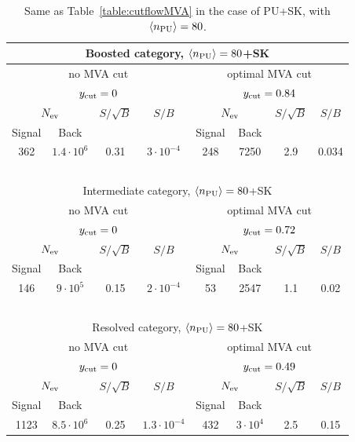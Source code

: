 \begin{table}[t]
  \centering
  \small
  \begin{tabular}{c|c|c|c||c|c|c|c}
    \hline
    \multicolumn{8}{c}{Boosted category, $\left\langle n_{\rm PU}\right\rangle=80$+SK}\\
    \hline
     \multicolumn{4}{c||}{no MVA cut} & \multicolumn{4}{c}{optimal MVA cut}\\
    \multicolumn{4}{c||}{$y_{\rm cut}=0$} & \multicolumn{4}{c}{$y_{\rm cut}=0.84$}\\
    \hline
    \multicolumn{2}{c|}{$N_{\rm ev}$} &  $S/\sqrt{B}$  & $S/B$
    & \multicolumn{2}{c|}{$N_{\rm ev}$} &  $S/\sqrt{B}$  & $S/B$\\
        Signal & Back   &     &   &  Signal & Back   &     &    \\
    \hline
    362  &  $1.4\cdot 10^6$     & 0.31       &  $3\cdot 10^{-4}$ &
    248     &   7250             &  2.9       & 0.034 \\
    \hline
       \multicolumn{8}{c}{$\quad$}\\
    \hline
    \multicolumn{8}{c}{Intermediate category,  $\left\langle n_{\rm PU}\right\rangle=80$+SK}\\
    \hline
    \multicolumn{4}{c||}{no MVA cut} & \multicolumn{4}{c}{optimal MVA cut}\\
    \multicolumn{4}{c||}{$y_{\rm cut}=0$} & \multicolumn{4}{c}{$y_{\rm cut}=0.72$}\\
    \hline
    \multicolumn{2}{c|}{$N_{\rm ev}$} &  $S/\sqrt{B}$  & $S/B$
    & \multicolumn{2}{c|}{$N_{\rm ev}$} &  $S/\sqrt{B}$  & $S/B$\\
        Signal & Back   &     &   &  Signal & Back   &     &    \\
    \hline
    146  &    $9\cdot 10^5$   & 0.15        &  $2\cdot 10^{-4}$      &
  53  &  2547        & 1.1        &  0.02 \\
  \hline
  \multicolumn{8}{c}{$\quad$}\\
    \hline
    \multicolumn{8}{c}{Resolved category,  $\left\langle n_{\rm PU}\right\rangle=80$+SK}\\
    \hline
     \multicolumn{4}{c||}{no MVA cut} & \multicolumn{4}{c}{optimal MVA cut}\\
    \multicolumn{4}{c||}{$y_{\rm cut}=0$} & \multicolumn{4}{c}{$y_{\rm cut}=0.49$}\\
    \hline
    \multicolumn{2}{c|}{$N_{\rm ev}$} &  $S/\sqrt{B}$  & $S/B$
    & \multicolumn{2}{c|}{$N_{\rm ev}$} &  $S/\sqrt{B}$  & $S/B$\\
        Signal & Back   &     &   &  Signal & Back   &     &    \\
    \hline
  1123  &    $8.5\cdot 10^6$   & 0.25       &  $1.3\cdot 10^{-4}$       &
  432  &  $3\cdot 10^4$        &   2.5      & 0.15 \\
        \hline
  \end{tabular}
  \caption{\small Same as Table~\ref{table:cutflowMVA} in the case
    of PU+SK, with $\left\langle n_{\rm PU}\right\rangle=80$.
        \label{table:cutflowMVA_PU}
  }
\end{table}

